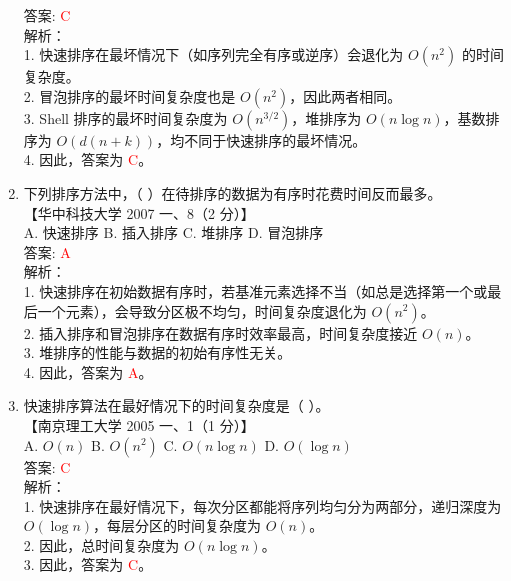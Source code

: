 \documentclass[lang=cn,newtx,10pt,scheme=chinese]{../../../elegantbook}
\begin{document}
\begin{enumerate}
    答案: \textcolor{red}{C} \\

    解析：\\
    1. 快速排序在最坏情况下（如序列完全有序或逆序）会退化为 $O(n^2)$ 的时间复杂度。\\
    2. 冒泡排序的最坏时间复杂度也是 $O(n^2)$，因此两者相同。\\
    3. Shell 排序的最坏时间复杂度为 $O(n^{3/2})$，堆排序为 $O(n \log n)$，基数排序为 $O(d(n + k))$，均不同于快速排序的最坏情况。\\
    4. 因此，答案为 \textcolor{red}{C}。\\

\item 下列排序方法中，（ ）在待排序的数据为有序时花费时间反而最多。\\
    【华中科技大学 2007 一、8（2 分）】\\  

    A. 快速排序 \quad B. 插入排序 \quad C. 堆排序 \quad D. 冒泡排序 \\

    答案: \textcolor{red}{A} \\

    解析：\\
    1. 快速排序在初始数据有序时，若基准元素选择不当（如总是选择第一个或最后一个元素），会导致分区极不均匀，时间复杂度退化为 $O(n^2)$。\\
    2. 插入排序和冒泡排序在数据有序时效率最高，时间复杂度接近 $O(n)$。\\
    3. 堆排序的性能与数据的初始有序性无关。\\
    4. 因此，答案为 \textcolor{red}{A}。\\

\item 快速排序算法在最好情况下的时间复杂度是（ ）。\\
    【南京理工大学 2005 一、1（1 分）】\\  

    A. $O(n)$ \quad B. $O(n^2)$ \quad C. $O(n \log n)$ \quad D. $O(\log n)$ \\

    答案: \textcolor{red}{C} \\

    解析：\\
    1. 快速排序在最好情况下，每次分区都能将序列均匀分为两部分，递归深度为 $O(\log n)$，每层分区的时间复杂度为 $O(n)$。\\
    2. 因此，总时间复杂度为 $O(n \log n)$。\\
    3. 因此，答案为 \textcolor{red}{C}。\\ 


\end{enumerate}
\end{document}
